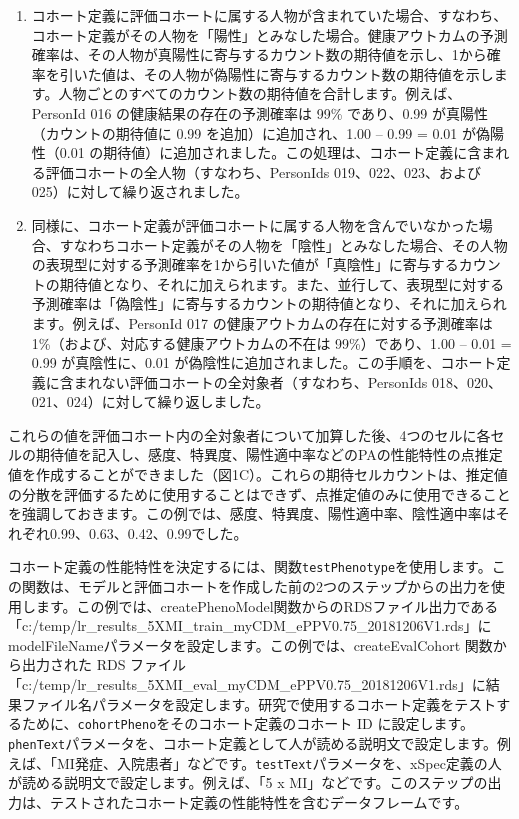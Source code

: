 \documentclass[
  11pt]{book}
\theoremstyle{definition}
\theoremstyle{definition}
\theoremstyle{definition}
\theoremstyle{definition}
\theoremstyle{remark}
\begin{document}
\begin{enumerate}
\def\labelenumi{\arabic{enumi}.}
\item
  コホート定義に評価コホートに属する人物が含まれていた場合、すなわち、コホート定義がその人物を「陽性」とみなした場合。健康アウトカムの予測確率は、その人物が真陽性に寄与するカウント数の期待値を示し、1から確率を引いた値は、その人物が偽陽性に寄与するカウント数の期待値を示します。人物ごとのすべてのカウント数の期待値を合計します。例えば、PersonId 016 の健康結果の存在の予測確率は 99\% であり、0.99 が真陽性（カウントの期待値に 0.99 を追加）に追加され、1.00 -- 0.99 = 0.01 が偽陽性（0.01 の期待値）に追加されました。この処理は、コホート定義に含まれる評価コホートの全人物（すなわち、PersonIds 019、022、023、および 025）に対して繰り返されました。
\item
  同様に、コホート定義が評価コホートに属する人物を含んでいなかった場合、すなわちコホート定義がその人物を「陰性」とみなした場合、その人物の表現型に対する予測確率を1から引いた値が「真陰性」に寄与するカウントの期待値となり、それに加えられます。また、並行して、表現型に対する予測確率は「偽陰性」に寄与するカウントの期待値となり、それに加えられます。例えば、PersonId 017 の健康アウトカムの存在に対する予測確率は 1\%（および、対応する健康アウトカムの不在は 99\%）であり、1.00 -- 0.01 = 0.99 が真陰性に、0.01 が偽陰性に追加されました。この手順を、コホート定義に含まれない評価コホートの全対象者（すなわち、PersonIds 018、020、021、024）に対して繰り返しました。
\end{enumerate}

これらの値を評価コホート内の全対象者について加算した後、4つのセルに各セルの期待値を記入し、感度、特異度、陽性適中率などのPAの性能特性の点推定値を作成することができました（図1C）。これらの期待セルカウントは、推定値の分散を評価するために使用することはできず、点推定値のみに使用できることを強調しておきます。この例では、感度、特異度、陽性適中率、陰性適中率はそれぞれ0.99、0.63、0.42、0.99でした。

コホート定義の性能特性を決定するには、関数\texttt{testPhenotype}を使用します。この関数は、モデルと評価コホートを作成した前の2つのステップからの出力を使用します。この例では、createPhenoModel関数からのRDSファイル出力である「c:/temp/lr\_results\_5XMI\_train\_myCDM\_ePPV0.75\_20181206V1.rds」にmodelFileNameパラメータを設定します。この例では、createEvalCohort 関数から出力された RDS ファイル「c:/temp/lr\_results\_5XMI\_eval\_myCDM\_ePPV0.75\_20181206V1.rds」に結果ファイル名パラメータを設定します。研究で使用するコホート定義をテストするために、\texttt{cohortPheno}をそのコホート定義のコホート ID に設定します。\texttt{phenText}パラメータを、コホート定義として人が読める説明文で設定します。例えば、「MI発症、入院患者」などです。\texttt{testText}パラメータを、xSpec定義の人が読める説明文で設定します。例えば、「5 x MI」などです。このステップの出力は、テストされたコホート定義の性能特性を含むデータフレームです。
\end{document}

